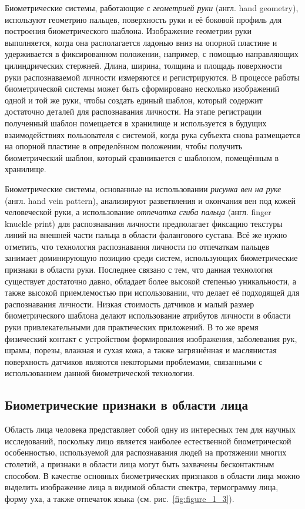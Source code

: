 \documentclass[12pt]{book}
\begin{document}
\large{Биометрические системы, работающие с \textit{геометрией руки} (англ. hand geometry), используют геометрию пальцев, поверхность руки и её боковой профиль для построения биометрического шаблона. Изображение геометрии руки выполняется, когда она располагается ладонью вниз на опорной пластине и удерживается в фиксированном положении, например, с помощью направляющих цилиндрических стержней. Длина, ширина, толщина и площадь поверхности руки распознаваемой личности измеряются и регистрируются. В процессе работы биометрической системы может быть сформировано несколько изображений одной и той же руки, чтобы создать единый шаблон, который содержит достаточно деталей для распознавания личности. На этапе регистрации полученный шаблон помещается в хранилище и используется в будущих взаимодействиях пользователя с системой, когда рука субъекта снова размещается на опорной пластине в определённом положении, чтобы получить биометрический шаблон, который сравнивается с шаблоном, помещённым в хранилище.}

\large{Биометрические системы, основанные на использовании \textit{рисунка вен на руке} (англ. hand vein pattern), анализируют разветвления и окончания вен под кожей человеческой руки, а использование \textit{отпечатка сгиба пальца} (англ. finger knuckle print) для распознавания личности предполагает фиксацию текстуры линий на внешней части пальца в области фалангового сустава. Всё же нужно отметить, что технология распознавания личности по отпечаткам пальцев занимает доминирующую позицию среди систем, использующих биометрические признаки в области руки. Последнее связано с тем, что данная технология существует достаточно давно, обладает более высокой степенью уникальности, а также высокой приемлемостью при использовании, что делает её подходящей для распознавания личности. Низкая стоимость датчиков и малый размер биометрического шаблона делают использование атрибутов личности в области руки привлекательными для практических приложений. В то же время физический контакт с устройством формирования изображения, заболевания рук, шрамы, порезы, влажная и сухая кожа, а также загрязнённая и маслянистая поверхность датчиков являются некоторыми проблемами, связанными с использованием данной биометрической технологии.}

\subsection{Биометрические признаки в области лица}

\large{Область лица человека представляет собой одну из интересных тем для научных исследований, поскольку лицо является наиболее естественной биометрической особенностью, используемой для распознавания людей на протяжении многих столетий, а признаки в области лица могут быть захвачены бесконтактным способом. В качестве основных биометрических признаков в области лица можно выделить изображение лица в видимой области спектра, термограмму лица, форму уха, а также отпечаток языка (см. рис.~\ref{fig:figure_1_3}).}
\end{document}
